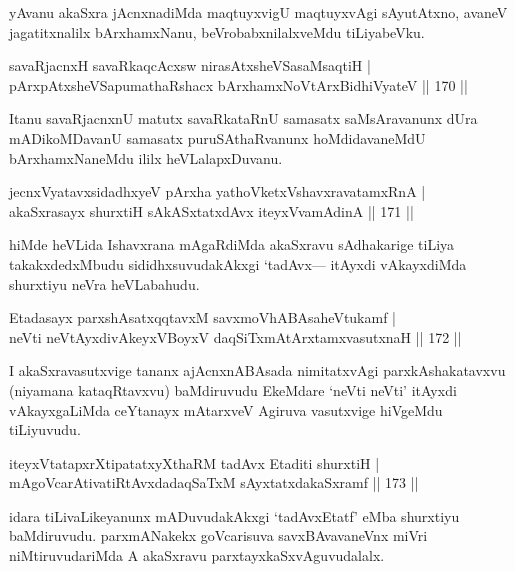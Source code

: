 \begin{artha}
yAvanu akaSxra jAcnxnadiMda maqtuyxvigU maqtuyxvAgi sAyutAtxno, avaneV jagatitxnalilx bArxhamxNanu, beVrobabxnilalxveMdu tiLiyabeVku.
\end{artha}


\begin{shl}
savaRjacnxH savaRkaqcAcxsw nirasAtxsheVSasaMsaqtiH |\\
pArxpAtxsheVSapumathaRshacx bArxhamxNoV\s tArxBidhiVyateV \hfill || 170 ||
\end{shl}

\begin{artha}
Itanu savaRjacnxnU matutx savaRkataRnU samasatx saMsAravanunx dUra mADikoMDavanU samasatx puruSAthaRvanunx hoMdidavaneMdU bArxhamxNaneMdu ililx heVLalapxDuvanu.
\end{artha}

\begin{shl}
jecnxVyatavxsidadhxyeV pArxha yathoVketxVshavxravatamxRnA |\\
akaSxrasayx shurxtiH sAkASxtatxdAvx iteyxVvamAdinA \hfill || 171 ||
\end{shl}

\begin{artha}
hiMde heVLida Ishavxrana mAgaRdiMda akaSxravu sAdhakarige tiLiya takakxdedxMbudu sididhxsuvudakAkxgi `tadAvx--- itAyxdi vAkayxdiMda shurxtiyu neVra heVLabahudu.
\end{artha}

\begin{shl}
Etadasayx parxshAsatxqqtavxM savxmoVhABAsaheVtukamf |\\
neVti neVtAyxdivAkeyxVBoyxV daqSiTxmAtArxtamxvasutxnaH \hfill || 172 ||
\end{shl}

\begin{artha}%
I akaSxravasutxvige tananx ajAcnxnABAsada nimitatxvAgi parxkAshakatavxvu (niyamana kataqRtavxvu) baMdiruvudu EkeMdare `neVti neVti' itAyxdi vAkayxgaLiMda ceYtanayx mAtarxveV Agiruva vasutxvige hiVgeMdu tiLiyuvudu.
\end{artha}

\begin{shl}
iteyxVtatapxrXtipatatxyXthaRM tadAvx Etaditi shurxtiH |\\
mAgoVcarAtivatiRtAvxdadaqSaTxM sAyxtatxdakaSxramf \hfill || 173 ||
\end{shl}

\begin{artha}
idara tiLivaLikeyanunx mADuvudakAkxgi `tadAvxEtatf' eMba shurxtiyu baMdiruvudu. parxmANakekx goVcarisuva savxBAvavaneVnx miVri niMtiruvudariMda A akaSxravu parxtayxkaSxvAguvudalalx.
\end{artha}

